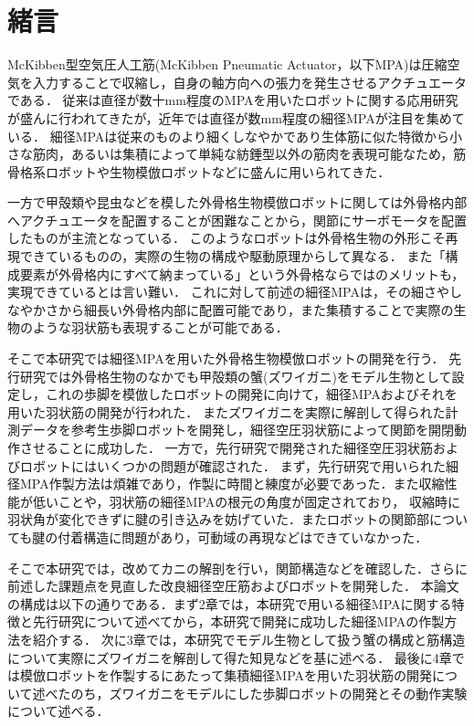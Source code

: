 \newpage
\setcounter{page}{1}
\section{緒言}
McKibben型空気圧人工筋(McKibben Pneumatic Actuator，以下MPA)は圧縮空気を入力することで収縮し，自身の軸方向への張力を発生させるアクチュエータである\cite{2003722}．
従来は直径が数十mm程度のMPAを用いたロボットに関する応用研究が盛んに行われてきたが，近年では直径が数mm程度の細径MPAが注目を集めている\cite{wakimoto}．
細径MPAは従来のものより細くしなやかであり生体筋に似た特徴から小さな筋肉，あるいは集積によって単純な紡錘型以外の筋肉を表現可能なため，筋骨格系ロボットや生物模倣ロボットなどに盛んに用いられてきた\cite{森田隆介2016}\cite{森和也2014}．

一方で甲殻類や昆虫などを模した外骨格生物模倣ロボットに関しては外骨格内部へアクチュエータを配置することが困難なことから，関節にサーボモータを配置したもの\cite{jmse10121804}が主流となっている．
このようなロボットは外骨格生物の外形こそ再現できているものの，実際の生物の構成や駆動原理からして異なる．
また「構成要素が外骨格内にすべて納まっている」という外骨格ならではのメリットも，実現できているとは言い難い．
これに対して前述の細径MPAは，その細さやしなやかさから細長い外骨格内部に配置可能であり，また集積することで実際の生物のような羽状筋も表現することが可能である\cite{2003}．

そこで本研究では細径MPAを用いた外骨格生物模倣ロボットの開発を行う．
先行研究\cite{hasegawa}では外骨格生物のなかでも甲殻類の蟹(ズワイガニ)をモデル生物として設定し，これの歩脚を模倣したロボットの開発に向けて，細径MPAおよびそれを用いた羽状筋の開発が行われた．
またズワイガニを実際に解剖して得られた計測データを参考生歩脚ロボットを開発し，細径空圧羽状筋によって関節を開閉動作させることに成功した\cite{hasegawa}．
一方で，先行研究\cite{hasegawa}で開発された細径空圧羽状筋およびロボットにはいくつかの問題が確認された．
まず，先行研究で用いられた細径MPA作製方法は煩雑であり，作製に時間と練度が必要であった．また収縮性能が低いことや，羽状筋の細径MPAの根元の角度が固定されており，
収縮時に羽状角が変化できずに腱の引き込みを妨げていた．またロボットの関節部についても腱の付着構造に問題があり，可動域の再現などはできていなかった．

そこで本研究では，改めてカニの解剖を行い，関節構造などを確認した．さらに前述した課題点を見直した改良細径空圧筋およびロボットを開発した．
本論文の構成は以下の通りである．まず2章では，本研究で用いる細径MPAに関する特徴と先行研究について述べてから，本研究で開発に成功した細径MPAの作製方法を紹介する．
次に3章では，本研究でモデル生物として扱う蟹の構成と筋構造について実際にズワイガニを解剖して得た知見などを基に述べる．
最後に4章では模倣ロボットを作製するにあたって集積細径MPAを用いた羽状筋の開発について述べたのち，ズワイガニをモデルにした歩脚ロボットの開発とその動作実験について述べる．

